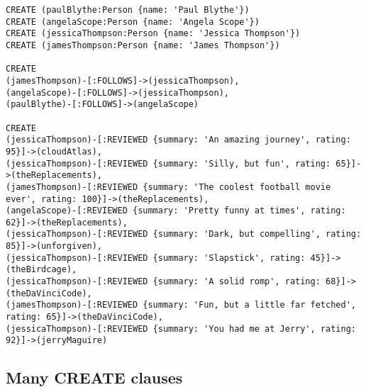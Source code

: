 \begin{lstlisting}
CREATE (paulBlythe:Person {name: 'Paul Blythe'})
CREATE (angelaScope:Person {name: 'Angela Scope'})
CREATE (jessicaThompson:Person {name: 'Jessica Thompson'})
CREATE (jamesThompson:Person {name: 'James Thompson'})

CREATE
(jamesThompson)-[:FOLLOWS]->(jessicaThompson),
(angelaScope)-[:FOLLOWS]->(jessicaThompson),
(paulBlythe)-[:FOLLOWS]->(angelaScope)

CREATE
(jessicaThompson)-[:REVIEWED {summary: 'An amazing journey', rating: 95}]->(cloudAtlas),
(jessicaThompson)-[:REVIEWED {summary: 'Silly, but fun', rating: 65}]->(theReplacements),
(jamesThompson)-[:REVIEWED {summary: 'The coolest football movie ever', rating: 100}]->(theReplacements),
(angelaScope)-[:REVIEWED {summary: 'Pretty funny at times', rating: 62}]->(theReplacements),
(jessicaThompson)-[:REVIEWED {summary: 'Dark, but compelling', rating: 85}]->(unforgiven),
(jessicaThompson)-[:REVIEWED {summary: 'Slapstick', rating: 45}]->(theBirdcage),
(jessicaThompson)-[:REVIEWED {summary: 'A solid romp', rating: 68}]->(theDaVinciCode),
(jamesThompson)-[:REVIEWED {summary: 'Fun, but a little far fetched', rating: 65}]->(theDaVinciCode),
(jessicaThompson)-[:REVIEWED {summary: 'You had me at Jerry', rating: 92}]->(jerryMaguire)
\end{lstlisting}

\subsection{Many CREATE clauses}

